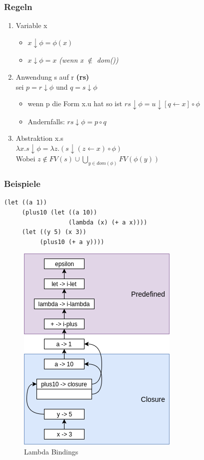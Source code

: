 \subsubsection{Regeln}
\begin{enumerate}
    \item Variable x
    \begin{itemize}
        \item $x \downarrow \phi = \phi(x)$
        \item $x \downarrow \phi = x$ \textit{(wenn x $\notin$ dom(\phi))}
    \end{itemize}
    \item Anwendung s auf r \textbf{(rs)} \\
    sei $p = r \downarrow \phi$ und $q = s \downarrow \phi$
    \begin{itemize}
        \item wenn p die Form \lambda x.u hat so ist
        $rs \downarrow \phi = u \downarrow [q \leftarrow x] \circ \phi$
        \item Andernfalls: $rs \downarrow \phi = p \circ q$
    \end{itemize}
    \item Abstraktion \lambda x.s \\
    $\lambda x.s \downarrow \phi = \lambda z.(s \downarrow (z \leftarrow x) \circ \phi)$ \\
    Wobei $z \notin FV(s) \cup \bigcup_{y \in dom(\phi)}FV(\phi(y))$
\end{enumerate}

\subsubsection{Beispiele}
\lstset{language=Scheme,style=customstyle}
\begin{lstlisting}
(let ((a 1))
     (plus10 (let ((a 10))
                  (lambda (x) (+ a x))))
     (let ((y 5) (x 3))
          (plus10 (+ a y))))
\end{lstlisting}
\begin{figure}[h!]
    \includegraphics[scale=.5]{pics/i-environment}
    \caption{Lambda Bindings}
\end{figure}
